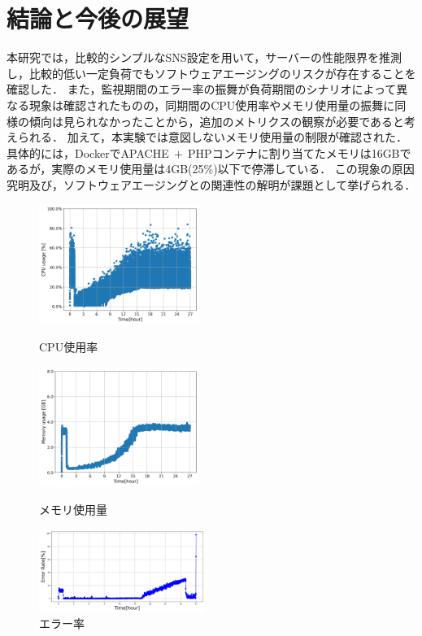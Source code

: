 \documentclass[twoside,twocolumn,10pt]{jarticle}  %
\begin{document}
\section{結論と今後の展望}
本研究では，比較的シンプルなSNS設定を用いて，サーバーの性能限界を推測し，比較的低い一定負荷でもソフトウェアエージングのリスクが存在することを確認した．
また，監視期間のエラー率の振舞が負荷期間のシナリオによって異なる現象は確認されたものの，同期間のCPU使用率やメモリ使用量の振舞に同様の傾向は見られなかったことから，追加のメトリクスの観察が必要であると考えられる．
加えて，本実験では意図しないメモリ使用量の制限が確認された．
具体的には，DockerでAPACHE$~+~$PHPコンテナに割り当てたメモリは16GBであるが，実際のメモリ使用量は4GB(25\%)以下で停滞している．
この現象の原因究明及び，ソフトウェアエージングとの関連性の解明が課題として挙げられる．\par
\begin{figure}[t]
  \centering
  \includegraphics[width=5.2cm]{figures/8core_1_15rps_increase_cpu.png}
  \vspace{-0.5cm}
  \caption{CPU使用率}
  \label{f1}

  \centering
  \includegraphics[width=5.2cm]{figures/8core_1_15rps_increase_mem.png}
  \vspace{-0.5cm}
  \caption{メモリ使用量}
  \label{f2}

  \centering
  \includegraphics[width=5.4cm]{figures/or_8core_1_15_error_rate.png}
  \vspace{-0.5cm}
  \caption{エラー率}
  \label{f3}
  \vspace{-0.5cm}
\end{figure}
\end{document}
